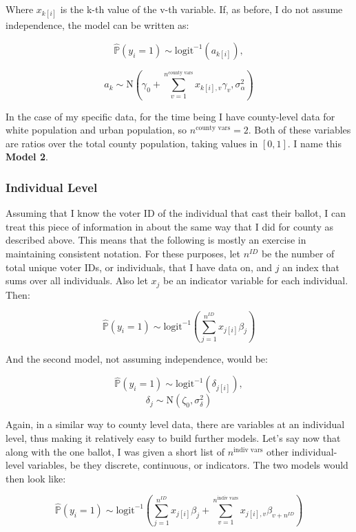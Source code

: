 \documentclass[12pt,twoside]{reedthesis}
\begin{document}
  Where \(x_{k[i]}\) is the k-th value of the v-th variable. If, as
  before, I do not assume independence, the model can be written as:
  
  \begin{equation} \tag{Model 2}  
  \hat{\mathbb{P}}(y_i = 1) \sim \text{logit}^{-1}(a_{k[i]}),
  \end{equation}
  
  \[a_{k} \sim \text{N}(\gamma_0 + \sum_{v=1}^{n^{\text{county vars}}}x_{k[i], v}\gamma_{v}, \sigma_{\alpha}^2)\]
  
  In the case of my specific data, for the time being I have county-level
  data for white population and urban population, so
  \(n^{\text{county vars}} = 2\). Both of these variables are ratios over
  the total county population, taking values in \([0,1]\). I name this
  \textbf{Model 2}.
  
  \subsubsection{Individual Level}\label{individual-level}
  
  Assuming that I know the voter ID of the individual that cast their
  ballot, I can treat this piece of information in about the same way that
  I did for county as described above. This means that the following is
  mostly an exercise in maintaining consistent notation. For these
  purposes, let \(n^{ID}\) be the number of total unique voter IDs, or
  individuals, that I have data on, and \(j\) an index that sums over all
  individuals. Also let \(x_{j}\) be an indicator variable for each
  individual. Then:
  
  \[\hat{\mathbb{P}}(y_i = 1) \sim \text{logit}^{-1}(\sum_{j = 1}^{n^{ID}}x_{j[i]}\beta_{j})\]
  
  And the second model, not assuming independence, would be:
  
  \[\hat{\mathbb{P}}(y_i = 1) \sim \text{logit}^{-1}(\delta_{j[i]}), \]
  \[\delta_{j} \sim \text{N}(\zeta_0, \sigma_{\delta}^2)\]
  
  Again, in a similar way to county level data, there are variables at an
  individual level, thus making it relatively easy to build further
  models. Let's say now that along with the one ballot, I was given a
  short list of \(n^{\text{indiv vars}}\) other individual-level
  variables, be they discrete, continuous, or indicators. The two models
  would then look like:
  
  \[\hat{\mathbb{P}}(y_i = 1) \sim \text{logit}^{-1}(\sum_{j = 1}^{n^{ID}}x_{j[i]}\beta_{j} + \sum_{v=1}^{n^{\text{indiv vars}}}x_{j[i], v}\beta_{v+n^{ID}})\]
  
\end{document}
